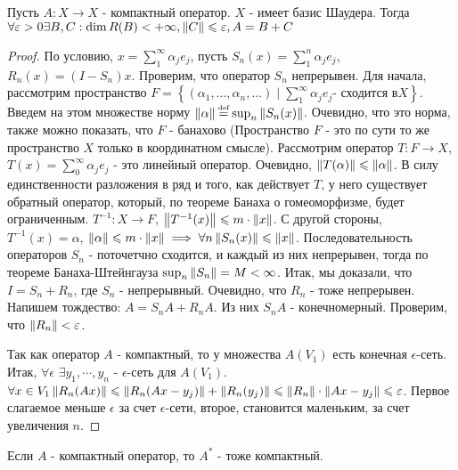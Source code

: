 \begin{theorem}
    Пусть $A: X \rightarrow X$ - компактный оператор. $X$ - имеет базис Шаудера. Тогда 
    $\forall \varepsilon > 0 \exists B, C: \dim R(B) < +\infty, \left\|C\right\| \leqslant \varepsilon, A = B + C$
\end{theorem}

\begin{proof}
    По условию, $x = \sum_{1}^{\infty}\alpha_j e_j$, пусть $S_n(x) = \sum_{1}^{n} \alpha_j e_j$, $R_n(x) = (I - S_n)x$. 
    Проверим, что оператор $S_n$ непрерывен. Для начала, рассмотрим пространство $F = 
    \left\{(\alpha_1, \dots, \alpha_n, \dots) \mid \sum_{1}^{\infty}\alpha_j e_j \text{- сходится в} X \right\}$.
    Введем на этом множестве норму $\norm{\alpha} \defeq \sup_{n} \norm{S_n(x)}$. Очевидно, что это норма, также можно показать, что $F$ - банахово (Пространство $F$ - 
    это по сути то же пространство $X$ только в координатном смысле).
    \todo Рассмотрим оператор $T: F \rightarrow X$, $T(x) = \sum_{0}^{\infty} \alpha_j e_j$ - это линейный оператор.
    Очевидно, $\left\|T(\alpha)\right\| \leqslant \left\|\alpha\right\|$. В силу единственности разложения в ряд и того, как действует $T$, у него существует обратный оператор,
    который, по теореме Банаха о гомеоморфизме, будет ограниченным. $T^{-1}: X \rightarrow F$, $\left\|T^{-1}(x)\right\| \leqslant m\cdot \left\|x\right\|$.
    С другой стороны, $T^{-1}(x) = \alpha$, $\left\|\alpha\right\| \leqslant m \cdot \left\|x\right\| \implies \forall n \left\|S_n(x)\right\| \leqslant \left\|x\right\|$.
    Последовательность операторов $S_n$ - поточетчно сходится, и каждый из них непрерывен, тогда по теореме Банаха-Штейнгауза $\sup_n{\left\|S_n\right\|} = M < \infty$.
    Итак, мы доказали, что $I = S_n + R_n$, где $S_n$ - непрерывный. Очевидно, что $R_n$ - тоже непрерывен.
    Напишем тождество: $A = S_n A + R_n A$. Из них $S_n A$ - конечномерный. Проверим, что $\left\|R_n\right\| < \varepsilon$.

    Так как оператор $A$ - компактный, то у множества $A(V_1)$ есть конечная $\epsilon$-сеть. Итак, $\forall \epsilon$ $\exists y_1, \cdots, y_n $ 
    - $\epsilon$-сеть для $A(V_1)$. $\forall x \in V_1 \left\|R_n(Ax)\right\| \leqslant \left\|R_n(Ax - y_j)\right\| +\left\|R_n(y_j)\right\| \leqslant \left\|R_n\right\| \cdot
    \left\|Ax - y_j\right\| \leqslant \varepsilon$.
    Первое слагаемое меньше $\epsilon$ за счет $\epsilon$-сети, второе, становится маленьким, за счет увеличения $n$.
\end{proof}

\begin{statement}
    Если $A$  - компактный оператор, то $A^*$ - тоже компактный.
\end{statement}

